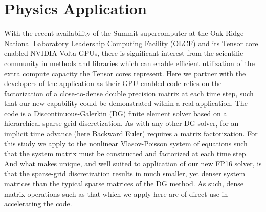 \section{Physics Application}
\label{sec:physics}
%
%
With the recent availability of the Summit supercomputer at the Oak Ridge National Laboratory Leadership Computing Facility (OLCF) and its Tensor core enabled NVIDIA Volta GPUs, there is significant interest from the scientific community in methods and libraries which can enable efficient utilization of the extra compute capacity the Tensor cores represent. Here we partner with the developers of the \asgard \cite{} application as their GPU enabled code relies on the factorization of a close-to-dense double precision matrix at each time step, such that our new \magma capability could be demonstrated within a real application. 
%
The \asgard code is a Discontinuous-Galerkin (DG) finite element solver based on a hierarchical sparse-grid discretization. As with any other DG solver, for an implicit time advance (here Backward Euler) requires a matrix factorization. For this study we apply \asgard to the nonlinear Vlasov-Poisson system of equations such that the system matrix must be constructed and factorized at each time step. And what makes \asgard unique, and well suited to application of our new FP16 solver, is that the sparse-grid discretization results in much smaller, yet denser system matrices than the typical sparse matrices of the DG method. As such, dense matrix operations such as that which we apply here are of direct use in accelerating the code. 
%
